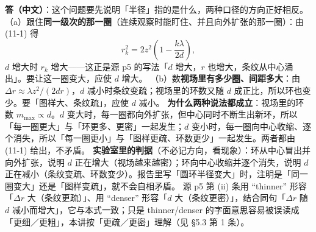 \documentclass[11pt]{ctexart}
\newcommand{\Dl}{d}
\begin{document}
\textbf{答（中文）}：这个问题要先说明「半径」指的是什么，两种口径的方向正好相反。
（a）跟住\textbf{同一级次的那一圈}（连续观察时能盯住、并且向外扩张的那一圈）：由 (11-1) 得
\[
  r_k^2=2z^2\left(1-\frac{k\lambda}{2\Dl}\right),
\]
$\Dl$ 增大时 $r_k$ 增大——这正是源 p5 的写法「$\Dl$ 增大，$r$ 也增大，条纹从中心涌出」。要让这一圈变大，应使 $\Dl$ 增大。
（b）数\textbf{视场里有多少圈、间距多大}：由 $\Delta r\approx\lambda z^2/(2\Dl r)$，$\Dl$ 减小时条纹变疏；视场里的环数又随 $\Dl$ 成正比，所以环也变少。要「图样大、条纹疏」，应使 $\Dl$ 减小。
\textbf{为什么两种说法都成立}：视场里的环数 $m_{\max}\propto\Dl$。$\Dl$ 变大时，每一圈都向外扩张，但中心同时不断生出新环，所以「每一圈更大」与「环更多、更密」一起发生；$\Dl$ 变小时，每一圈向中心收缩、逐个消失，所以「每一圈更小」与「图样更疏、环数更少」一起发生。两者都由 (11-1) 给出，不矛盾。
\textbf{实验室里的判据}（不必记方向，看现象）：环从中心冒出并向外扩张，说明 $\Dl$ 正在增大（视场越来越密）；环向中心收缩并逐个消失，说明 $\Dl$ 正在减小（条纹变疏、环数变少）。报告里写「圆环半径变大」时，注明是「同一圈变大」还是「图样变疏」，就不会自相矛盾。
源 p5 第 (ii) 条用 ``thinner'' 形容「$\Delta r$ 大（条纹更疏）」、用 ``denser'' 形容「$\Dl$ 大（条纹更密）」，结合同句「$\Delta r$ 随 $\Dl$ 减小而增大」，它与本式一致；只是 thinner/denser 的字面意思容易被误读成「更细／更粗」，本讲按「更疏／更密」理解（见 §5.3 第 1 条）。
\end{document}
